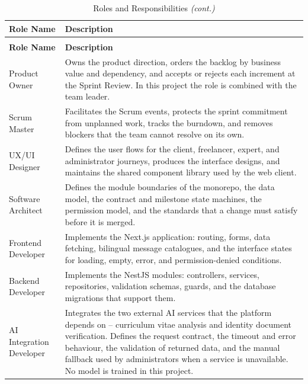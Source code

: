 \begingroup
\small
\setlength{\tabcolsep}{4pt}
\renewcommand{\arraystretch}{1.3}

\begin{longtable}{|L{3.8cm}|L{10.6cm}|}
\caption{Roles and Responsibilities}
\label{tab:roles_responsibilities} \\
\hline
{}
\textbf{Role Name} & \textbf{Description} \\
\hline
\endfirsthead

\caption[]{Roles and Responsibilities \textit{(cont.)}} \\
\hline
{}
\textbf{Role Name} & \textbf{Description} \\
\hline
\endhead

\hline
\endfoot
\hline
\endlastfoot

Product Owner &
Owns the product direction, orders the backlog by business value and dependency, and accepts or rejects each increment at the Sprint Review. In this project the role is combined with the team leader.
\\ \hline

Scrum Master &
Facilitates the Scrum events, protects the sprint commitment from unplanned work, tracks the burndown, and removes blockers that the team cannot resolve on its own.
\\ \hline

UX/UI Designer &
Defines the user flows for the client, freelancer, expert, and administrator journeys, produces the interface designs, and maintains the shared component library used by the web client.
\\ \hline

Software Architect &
Defines the module boundaries of the monorepo, the data model, the contract and milestone state machines, the permission model, and the standards that a change must satisfy before it is merged.
\\ \hline

Frontend Developer &
Implements the Next.js application: routing, forms, data fetching, bilingual message catalogues, and the interface states for loading, empty, error, and permission-denied conditions.
\\ \hline

Backend Developer &
Implements the NestJS modules: controllers, services, repositories, validation schemas, guards, and the database migrations that support them.
\\ \hline

AI Integration Developer &
Integrates the two external AI services that the platform depends on -- curriculum vitae analysis and identity document verification. Defines the request contract, the timeout and error behaviour, the validation of returned data, and the manual fallback used by administrators when a service is unavailable. No model is trained in this project.
\\ \hline


\end{longtable}
